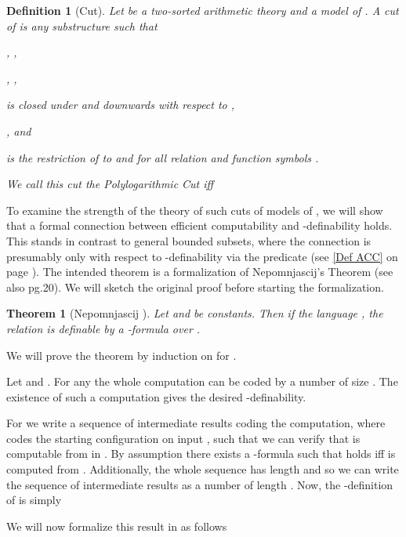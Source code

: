 \documentclass{LMCS}
\newtheorem{theorem}{Theorem}[section]
\newtheorem{definition}{Definition}[section]
\begin{document}
\begin{definition}
  [Cut] Let  be a two-sorted arithmetic theory and
   a model of .
  A {\em cut}  of  is any substructure
  such that
  \begin{iteMize}{}
    \item , ,
    \item , ,
    \item  is closed under  and downwards with respect to ,
    \item , and
    \item  is the restriction of  to  and  for all
          relation and function symbols .
  \end{iteMize}
  We call this cut the {\em Polylogarithmic Cut} iff
  
\end{definition}

To examine the strength of the theory of such cuts of models of , we will show that a formal connection
between efficient computability and -definability holds. This stands in contrast to general bounded
subsets, where the connection is presumably only with respect to -definability via the predicate
 (see \eqref{Def ACC} on page \pageref{Def ACC}). The intended theorem is a formalization of
Nepomnjascij's Theorem \cite{Nep70} (see also \cite{Kra95} pg.20). We will sketch the original proof before
starting the formalization.

\begin{theorem}[Nepomnjascij \cite{Nep70}]
  \label{Thm Nepomnjascij} Let  and  be
  constants. Then if the language ,
  the relation  is definable by a -formula over .
\end{theorem}

\proof
  We will prove the theorem by induction on  for
  .

  Let  and .
  For any  the whole computation can be coded by a number  of size
  . The existence of such a computation gives the desired -definability.

  For  we write a sequence 
  of intermediate results coding the computation, where  codes the starting configuration
  on input , such that we can verify
  that  is computable from  in
  .
  By assumption there exists a -formula  such that
   holds iff  is computed
  from . Additionally, the whole sequence has length 
  and so we can write the sequence of intermediate results  as a number  of length .
  Now, the -definition of  is simply
  

\noindent We will now formalize this result in  as follows
\end{document}
